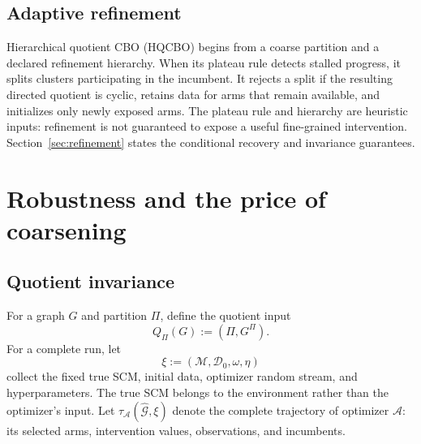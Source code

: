 \documentclass[twoside]{article}
\newcommand{\HQCBO}{\textsc{HQCBO}}
\newcommand{\Gg}{\mathcal{G}}
\begin{document}
\begin{center}
\small
{}
\end{center}

\subsection{Adaptive refinement}

Hierarchical quotient CBO (\HQCBO{}) begins from a coarse partition and a declared refinement hierarchy. When its plateau rule detects stalled progress, it splits clusters participating in the incumbent. It rejects a split if the resulting directed quotient is cyclic, retains data for arms that remain available, and initializes only newly exposed arms. The plateau rule and hierarchy are heuristic inputs: refinement is not guaranteed to expose a useful fine-grained intervention. Section~\ref{sec:refinement} states the conditional recovery and invariance guarantees.

\section{Robustness and the price of coarsening}
\label{sec:theory}

\subsection{Quotient invariance}
\label{sec:invariance}

For a graph \(G\) and partition \(\Pi\), define the quotient input
\begin{equation}
 Q_\Pi(G):=(\Pi,G^\Pi).
 \label{eq:quotient}
\end{equation}
For a complete run, let
\[
 \xi:=(\mathcal M,\mathcal D_0,\omega,\eta)
\]
collect the fixed true SCM, initial data, optimizer random stream, and hyperparameters. The true SCM belongs to the environment rather than the optimizer's input. Let \(\tau_{\mathcal A}(\widehat{\Gg},\xi)\) denote the complete trajectory of optimizer \(\mathcal A\): its selected arms, intervention values, observations, and incumbents.
\end{document}
